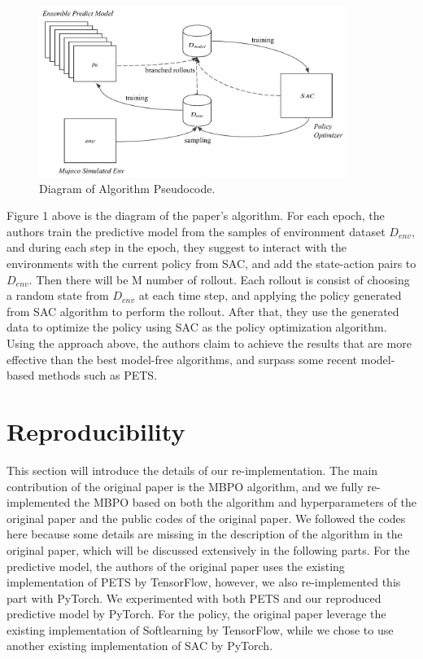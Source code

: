 \begin{figure}[h]
  \centering
  \includegraphics[width=10cm]{../openreview/mbpo_new.png}
  \caption{Diagram of Algorithm Pseudocode.}
\end{figure}

Figure 1 above is the diagram of the paper's algorithm. For each epoch, the authors train the predictive model from the samples of environment dataset $D_{env}$, and during each step in the epoch, they suggest to interact with the environments with the current policy from SAC, and add the state-action pairs to $D_{env}$. Then there will be M number of rollout. Each rollout is consist of choosing a random state from $D_{env}$ at each time step, and applying the policy generated from SAC algorithm to perform the rollout. After that, they use the generated data to optimize the policy using SAC as the policy optimization algorithm. Using the approach above, the authors claim to achieve the results that are more effective than the best model-free algorithms, and surpass some recent model-based methods such as PETS.

\section{Reproducibility}
This section will introduce the details of our re-implementation. The main contribution of the original paper is the MBPO algorithm, and we fully re-implemented the MBPO based on both the algorithm and hyperparameters of the original paper and the public codes of the original paper. We followed the codes here because some details are missing in the description of the algorithm in the original paper, which will be discussed extensively in the following parts. For the predictive model, the authors of the original paper uses the existing implementation of PETS by TensorFlow, however, we also re-implemented this part with PyTorch. We experimented with both PETS and our reproduced predictive model by PyTorch. For the policy, the original paper leverage the existing implementation of Softlearning by TensorFlow, while we chose to use another existing implementation of SAC by PyTorch.

